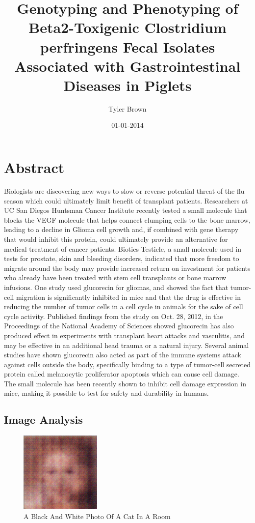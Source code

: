 \documentclass{article}%
\title{Genotyping and Phenotyping of Beta2{-}Toxigenic Clostridium perfringens Fecal Isolates Associated with Gastrointestinal Diseases in Piglets}%
\author{Tyler Brown}%
\affil{Department of Biochemistry and Molecular Biology, Bengbu Medical College, Bengbu, Anhui, China}%
\date{01{-}01{-}2014}%
\begin{document}
%
\normalsize%
\maketitle%
\section{Abstract}%
\label{sec:Abstract}%
Biologists are discovering new ways to slow or reverse potential threat of the flu season which could ultimately limit benefit of transplant patients.\newline%
Researchers at UC San Diegos Huntsman Cancer Institute recently tested a small molecule that blocks the VEGF molecule that helps connect clumping cells to the bone marrow, leading to a decline in Glioma cell growth and, if combined with gene therapy that would inhibit this protein, could ultimately provide an alternative for medical treatment of cancer patients.\newline%
Biotics Testicle, a small molecule used in tests for prostate, skin and bleeding disorders, indicated that more freedom to migrate around the body may provide increased return on investment for patients who already have been treated with stem cell transplants or bone marrow infusions.\newline%
One study used glucorecin for gliomas, and showed the fact that tumor{-}cell migration is significantly inhibited in mice and that the drug is effective in reducing the number of tumor cells in a cell cycle in animals for the sake of cell cycle activity.\newline%
Published findings from the study on Oct. 28, 2012, in the Proceedings of the National Academy of Sciences showed glucorecin has also produced effect in experiments with transplant heart attacks and vasculitis, and may be effective in an additional head trauma or a natural injury.\newline%
Several animal studies have shown glucorecin also acted as part of the immune systems attack against cells outside the body, specifically binding to a type of tumor{-}cell secreted protein called melanocytic proliferator apoptosis which can cause cell damage.\newline%
The small molecule has been recently shown to inhibit cell damage expression in mice, making it possible to test for safety and durability in humans.

%
\subsection{Image Analysis}%
\label{subsec:ImageAnalysis}%


\begin{figure}[h!]%
\centering%
\includegraphics[width=150px]{500_fake_images/samples_5_61.png}%
\caption{A Black And White Photo Of A Cat In A Room}%
\end{figure}

%
\end{document}
